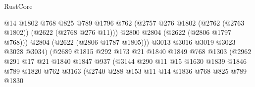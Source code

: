 \begin{lexlean}{RustCore}
\begin{coremodule}
                                      @14
                                      @1802
                                      @768
                                      @825
                                      @789
                                      @1796
                                      @762
                                      (@2757
                                        @276
                                        @1802
                                        (@2762 (@2763 @1802))
                                        (@2622 (@2768 @276 @11)))
                                      @2800
                                      @2804
                                      (@2622 (@2806 @1797 @768)))
                                    @2804
                                    (@2622 (@2806 @1787 @1805)))
                                  @3013
                                  @3016
                                  @3019
                                  @3023
                                  @3028
                                  @3034)
                                (@2689
                                  @1815
                                  @292
                                  @173
                                  @21
                                  @1840
                                  @1849
                                  @768
                                  @1303
                                  (@2962
                                    @291
                                    @17
                                    @21
                                    @1840
                                    @1847
                                    @937
                                    (@3144
                                      @290
                                      @11
                                      @15
                                      @1630
                                      @1839
                                      @1846
                                      @789
                                      @1820
                                      @762
                                      @3163
                                      (@2740
                                        @288
                                        @153
                                        @11
                                        @14
                                        @1836
                                        @768
                                        @825
                                        @789
                                        @1830

\end{coremodule}
\end{lexlean}

